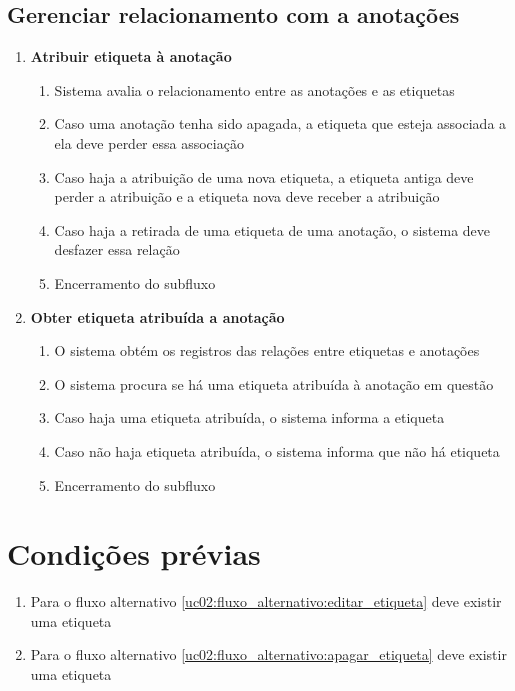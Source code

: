 \documentclass[
	12pt,				%
	oneside,			%
	a4paper,			%
	english,			%
	brazil,				%
	]{abntex2}
\begin{document}
\subsection{Gerenciar relacionamento com a anotações}
\begin{enumerate}[label=\textbf{UC02-S{\arabic*}},font=\normalsize]
    \item \textbf{\normalsize Atribuir etiqueta à anotação} \label{uc02:subfluxo:atribuir_etiqueta}
    \begin{enumerate}[label={\arabic*}.]
        \item Sistema avalia o relacionamento entre as anotações e as etiquetas \label{uc02:subfluxo:nome_fluxo_1:nome_passo1}
        \item Caso uma anotação tenha sido apagada, a etiqueta que esteja associada a ela deve perder essa associação
        \item Caso haja a atribuição de uma nova etiqueta, a etiqueta antiga deve perder a atribuição e a etiqueta nova deve receber a atribuição
        \item Caso haja a retirada de uma etiqueta de uma anotação, o sistema deve desfazer essa relação
        \item Encerramento do subfluxo
    \end{enumerate}

    \item \textbf{\normalsize Obter etiqueta atribuída a anotação} \label{uc02:subfluxo:ler_etiquetas_atribuidas}
    \begin{enumerate}[label={\arabic*}.]
        \item O sistema obtém os registros das relações entre etiquetas e anotações
        \item O sistema procura se há uma etiqueta atribuída à anotação em questão
        \item Caso haja uma etiqueta atribuída, o sistema informa a etiqueta
        \item Caso não haja etiqueta atribuída, o sistema informa que não há etiqueta
        \item Encerramento do subfluxo
    \end{enumerate}
\end{enumerate}

\section{Condições prévias}
\begin{enumerate}
    \item Para o fluxo alternativo \ref{uc02:fluxo_alternativo:editar_etiqueta} deve existir uma etiqueta
    \item Para o fluxo alternativo \ref{uc02:fluxo_alternativo:apagar_etiqueta} deve existir uma etiqueta
\end{enumerate}
\end{document}

